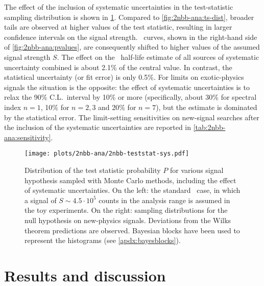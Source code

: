 The effect of the inclusion of systematic uncertainties in the test-statistic sampling
distribution is shown in \cref{fig:2nbb-ana:ts-dist-sys}. Compared to
\cref{fig:2nbb-ana:ts-dist}, broader tails are observed at higher values of the test
statistic, resulting in larger confidence intervals on the signal strength. \pvalue\
curves, shown in the right-hand side of \cref{fig:2nbb-ana:pvalues}, are consequently
shifted to higher values of the assumed signal strength $S$. The effect on the \nnbb\
half-life estimate of all sources of systematic uncertainty combined is about 2.1\% of the
central value. In contrast, the statistical uncertainty (or fit error) is only 0.5\%. For
limits on exotic-physics signals the situation is the opposite: the effect of systematic
uncertainties is to relax the 90\% C.L.~interval by 10\% or more (specifically, about 30\%
for spectral index $n=1$, 10\% for $n=2,3$ and 20\% for $n=7$), but the estimate is
dominated by the statistical error. The limit-setting sensitivities on new-signal searches
after the inclusion of the systematic uncertainties are reported in
\cref{tab:2nbb-ana:sensitivity}.

\begin{figure}
  \centering
  \texttt{[image: plots/2nbb-ana/2nbb-teststat-sys.pdf]}
  \caption{%
    Distribution of the test statistic probability $P$ for various signal hypothesis
    sampled with Monte Carlo methods, including the effect of systematic uncertainties. On
    the left: the standard \nnbb\ case, in which a signal of $S \sim 4.5 \cdot 10^5$
    counts in the analysis range is assumed in the toy experiments. On the right: sampling
    distributions for the null hypothesis on new-physics signals.  Deviations from the
    Wilks theorem predictions are observed. Bayesian blocks have been used to represent
    the histograms (see \cref{apdx:bayesblocks}).
  }\label{fig:2nbb-ana:ts-dist-sys}
\end{figure}

%   

\section{Results and discussion}%
\label{sec:2nbb-ana:results}

